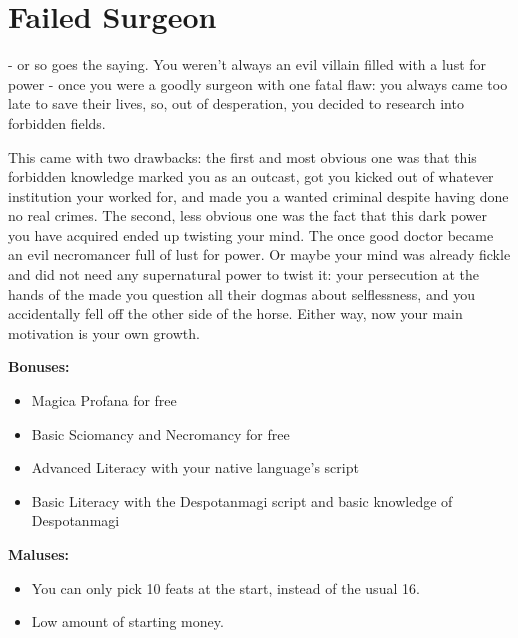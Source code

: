 \section{Failed Surgeon}
 - or so goes the saying. You weren't always an evil villain filled with a lust for power - once you were a goodly surgeon with one fatal flaw: you always came too late to save their lives, so, out of desperation, you decided to research into forbidden fields.

This came with two drawbacks: the first and most obvious one was that this forbidden knowledge marked you as an outcast, got you kicked out of whatever institution your worked for, and made you a wanted criminal despite having done no real crimes. The second, less obvious one was the fact that this dark power you have acquired ended up twisting your mind. The once good doctor became an evil necromancer full of lust for power. Or maybe your mind was already fickle and did not need any supernatural power to twist it: your persecution at the hands of the  made you question all their dogmas about selflessness, and you accidentally fell off the other side of the horse. Either way, now your main motivation is your own growth.

\textbf{Bonuses:}
\begin{itemize}
	\item Magica Profana for free
	\item Basic Sciomancy and Necromancy for free
	\item Advanced Literacy with your native language's script
	\item Basic Literacy with the Despotanmagi script and basic knowledge of Despotanmagi 
\end{itemize}


\textbf{Maluses:}
\begin{itemize}
	\item You can only pick 10 feats at the start, instead of the usual 16.
	\item Low amount of starting money.
\end{itemize}
